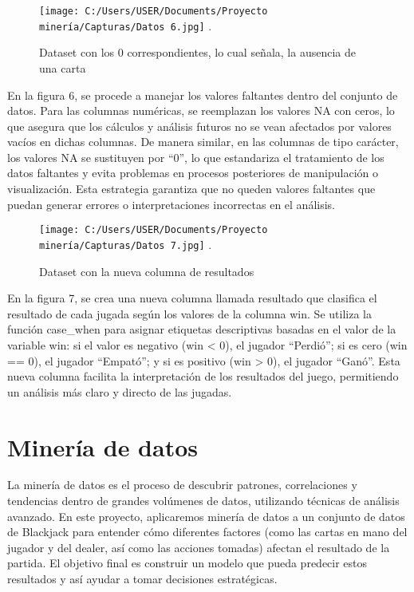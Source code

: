 \documentclass[conference,final,]{IEEEtran}
\begin{document}
\begin{figure}[htbp]
\centering
\texttt{[image: C:/Users/USER/Documents/Proyecto minería/Capturas/Datos 6.jpg]}
\DeclareGraphicsExtensions.
\caption{Dataset con los 0 correspondientes, lo cual señala, la ausencia de una carta}
\label{Dataset 6}
\end{figure}

En la figura 6, se procede a manejar los valores faltantes dentro del
conjunto de datos. Para las columnas numéricas, se reemplazan los
valores NA con ceros, lo que asegura que los cálculos y análisis futuros
no se vean afectados por valores vacíos en dichas columnas. De manera
similar, en las columnas de tipo carácter, los valores NA se sustituyen
por ``0'', lo que estandariza el tratamiento de los datos faltantes y
evita problemas en procesos posteriores de manipulación o visualización.
Esta estrategia garantiza que no queden valores faltantes que puedan
generar errores o interpretaciones incorrectas en el análisis.

\begin{figure}[htbp]
\centering
\texttt{[image: C:/Users/USER/Documents/Proyecto minería/Capturas/Datos 7.jpg]}
\DeclareGraphicsExtensions.
\caption{Dataset con la nueva columna de resultados}
\label{Dataset 7}
\end{figure}

En la figura 7, se crea una nueva columna llamada resultado que
clasifica el resultado de cada jugada según los valores de la columna
win. Se utiliza la función case\_when para asignar etiquetas
descriptivas basadas en el valor de la variable win: si el valor es
negativo (win \textless{} 0), el jugador ``Perdió''; si es cero (win ==
0), el jugador ``Empató''; y si es positivo (win \textgreater{} 0), el
jugador ``Ganó''. Esta nueva columna facilita la interpretación de los
resultados del juego, permitiendo un análisis más claro y directo de las
jugadas.

\section{Minería de datos}\label{mineruxeda-de-datos}

La minería de datos es el proceso de descubrir patrones, correlaciones y
tendencias dentro de grandes volúmenes de datos, utilizando técnicas de
análisis avanzado. En este proyecto, aplicaremos minería de datos a un
conjunto de datos de Blackjack para entender cómo diferentes factores
(como las cartas en mano del jugador y del dealer, así como las acciones
tomadas) afectan el resultado de la partida. El objetivo final es
construir un modelo que pueda predecir estos resultados y así ayudar a
tomar decisiones estratégicas.
\end{document}
